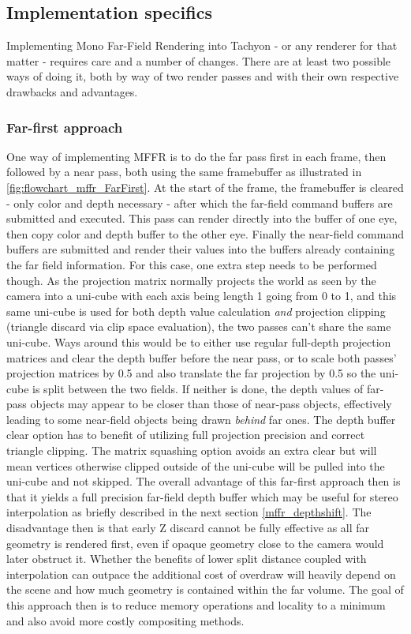 \subsection{Implementation specifics}
Implementing Mono Far-Field Rendering into Tachyon - or any renderer for that matter - requires care and a number of changes. There are at least two possible ways of doing it, both by way of two render passes and with their own respective drawbacks and advantages. 
\subsubsection{Far-first approach}
One way of implementing MFFR is to do the far pass first in each frame, then followed by a near pass, both using the same framebuffer as illustrated in \autoref{fig:flowchart_mffr_FarFirst}. At the start of the frame, the framebuffer is cleared - only color and depth necessary - after which the far-field command buffers are submitted and executed. This pass can render directly into the buffer of one eye, then copy color and depth buffer to the other eye. Finally the near-field command buffers are submitted and render their values into the buffers already containing the far field information. 
For this case, one extra step needs to be performed though. As the projection matrix normally projects the world as seen by the camera into a uni-cube with each axis being length 1 going from 0 to 1, and this same uni-cube is used for both depth value calculation \textit{and} projection clipping (triangle discard via clip space evaluation), the two passes can't share the same uni-cube. Ways around this would be to either use regular full-depth projection matrices and clear the depth buffer before the near pass, or to scale both passes' projection matrices by 0.5 and also translate the far projection by 0.5 so the uni-cube is split between the two fields. 
If neither is done, the depth values of far-pass objects may appear to be closer than those of near-pass objects, effectively leading to some near-field objects being drawn \textit{behind} far ones. 
The depth buffer clear option has to benefit of utilizing full projection precision and correct triangle clipping. The matrix squashing option avoids an extra clear but will mean vertices otherwise clipped outside of the uni-cube will be pulled into the uni-cube and not skipped. 
The overall advantage of this far-first approach then is that it yields a full precision far-field depth buffer which may be useful for stereo interpolation as briefly described in the next section \ref{mffr_depthshift}. The disadvantage then is that early Z discard cannot be fully effective as all far geometry is rendered first, even if opaque geometry close to the camera would later obstruct it. Whether the benefits of lower split distance coupled with interpolation can outpace the additional cost of overdraw will heavily depend on the scene and how much geometry is contained within the far volume. 
The goal of this approach then is to reduce memory operations and locality to a minimum and also avoid more costly compositing methods. 
